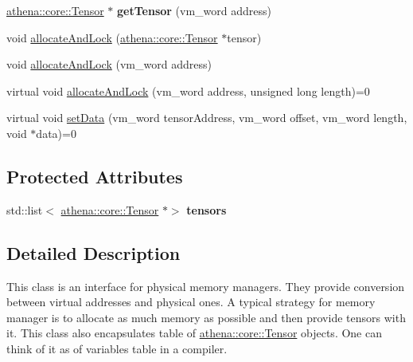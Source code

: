 \begin{DoxyCompactItemize}
\mbox{\label{classathena_1_1backend_1_1_abstract_memory_manager_abd79e10b1e4d51ed592075138e0076f2}} 
\mbox{\hyperlink{classathena_1_1core_1_1_tensor}{athena\+::core\+::\+Tensor}} $\ast$ {\bfseries get\+Tensor} (vm\+\_\+word address)
\item 
void \mbox{\hyperlink{classathena_1_1backend_1_1_abstract_memory_manager_ad40a653a8b32410956ba835ca1bb3e5f}{allocate\+And\+Lock}} (\mbox{\hyperlink{classathena_1_1core_1_1_tensor}{athena\+::core\+::\+Tensor}} $\ast$tensor)
\item 
void \mbox{\hyperlink{classathena_1_1backend_1_1_abstract_memory_manager_ab5305b3d1ab91960bf179ce0be166120}{allocate\+And\+Lock}} (vm\+\_\+word address)
\item 
virtual void \mbox{\hyperlink{classathena_1_1backend_1_1_abstract_memory_manager_a1b80008e94c21d5ac87f9a45d3f212a8}{allocate\+And\+Lock}} (vm\+\_\+word address, unsigned long length)=0
\item 
virtual void \mbox{\hyperlink{classathena_1_1backend_1_1_abstract_memory_manager_a18562c6f336ff0f7ff800f877696c851}{set\+Data}} (vm\+\_\+word tensor\+Address, vm\+\_\+word offset, vm\+\_\+word length, void $\ast$data)=0
\end{DoxyCompactItemize}
\subsection*{Protected Attributes}
\begin{DoxyCompactItemize}
\item 
\mbox{\label{classathena_1_1backend_1_1_abstract_memory_manager_a95e7f8064dea9c79d8e88d39affafda7}} 
std\+::list$<$ \mbox{\hyperlink{classathena_1_1core_1_1_tensor}{athena\+::core\+::\+Tensor}} $\ast$$>$ {\bfseries tensors}
\end{DoxyCompactItemize}


\subsection{Detailed Description}
This class is an interface for physical memory managers. They provide conversion between virtual addresses and physical ones. A typical strategy for memory manager is to allocate as much memory as possible and then provide tensors with it. This class also encapsulates table of \mbox{\hyperlink{classathena_1_1core_1_1_tensor}{athena\+::core\+::\+Tensor}} objects. One can think of it as of variables table in a compiler. 

